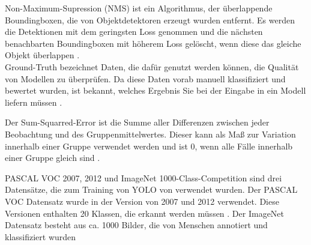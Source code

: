{{	Non-Maximum-Supression (NMS) ist ein Algorithmus, der überlappende Boundingboxen, die von Objektdetektoren erzeugt wurden entfernt. Es werden die Detektionen mit dem geringsten Loss genommen und die nächsten benachbarten Boundingboxen mit höherem Loss gelöscht, wenn diese das gleiche Objekt überlappen \citep{Hosang2017}. \\

	Ground-Truth bezeichnet Daten, die dafür genutzt werden können, die Qualität von Modellen zu überprüfen. Da diese Daten vorab manuell klassifiziert und bewertet wurden, ist bekannt, welches Ergebnis Sie bei der Eingabe in ein Modell liefern müssen \citep{Ground_truth_desc}.

	Der Sum-Squarred-Error ist die Summe aller Differenzen zwischen jeder Beobachtung und des Gruppenmittelwertes. Dieser kann als Maß zur Variation innerhalb einer Gruppe verwendet werden und ist 0, wenn alle Fälle innerhalb einer Gruppe gleich sind \citep{SOSQE_desc}.

	PASCAL VOC 2007, 2012 und ImageNet 1000-Class-Competition \citep{Russakovsky2015} sind drei Datensätze, die zum Training von YOLO von \cite{Redmon2016} verwendet wurden. Der PASCAL VOC Datensatz wurde in der Version von 2007 und 2012 verwendet. Diese Versionen enthalten 20 Klassen, die erkannt werden müssen  \citep{pascal_voc}.  Der ImageNet Datensatz besteht aus ca. 1000 Bilder, die von Menschen annotiert und klassifiziert wurden \citep{imageNET_about}
	}
}
